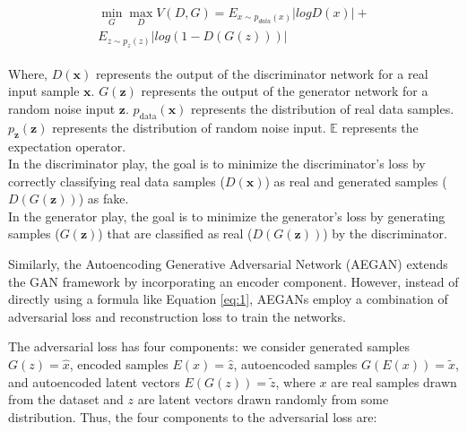 \documentclass[letterpaper]{article} %
\begin{document}
\begin{gather}\label{eq:1}
    \begin{aligned}
        \min_{G}\max_{D} V(D,G) = E_{x \sim p_{data}(x)}|log D(x)| +  \\ E_{z \sim p_{z}(z)}|log (1 - D(G(z)))|
    \end{aligned}
\end{gather}

Where,
\(D(\mathbf{x})\) represents the output of the discriminator network for a real input sample \(\mathbf{x}\).
\(G(\mathbf{z})\) represents the output of the generator network for a random noise input \(\mathbf{z}\).
\(p_{\text{data}}(\mathbf{x})\) represents the distribution of real data samples.
\(p_{\mathbf{z}}(\mathbf{z})\) represents the distribution of random noise input.
\(\mathbb{E}\) represents the expectation operator. \\
In the discriminator play, the goal is to minimize the discriminator's loss by correctly classifying real data samples (\(D(\mathbf{x})\)) as real and generated samples (\(D(G(\mathbf{z}))\)) as fake. \\
In the generator play, the goal is to minimize the generator's loss by generating samples (\(G(\mathbf{z})\)) that are classified as real (\(D(G(\mathbf{z}))\)) by the discriminator.

Similarly, the Autoencoding Generative Adversarial Network (AEGAN) extends the GAN framework by incorporating an encoder component. However, instead of directly using a formula like Equation \ref{eq:1}, AEGANs employ a combination of adversarial loss and reconstruction loss to train the networks.

The adversarial loss has four components: we consider generated samples $G(z) = \hat{x}$, encoded samples $E(x) = \hat{z}$, autoencoded samples $G(E(x)) = \widetilde{x}$, and autoencoded latent vectors $E(G(z)) = \widetilde{z}$, where $x$ are real samples drawn from the dataset and $z$ are latent vectors drawn randomly from some distribution. Thus, the four components to the adversarial loss are:
\end{document}
